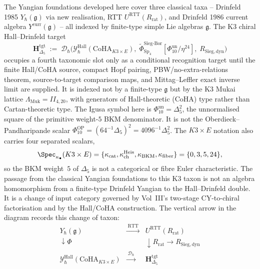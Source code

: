 \begin{remark}
\label{rem:yangfnd-1}
The Yangian foundations developed here cover three classical taxa --
Drinfeld 1985 $Y_\hbar(\mathfrak g)$ via new realisation, RTT
$U^{\mathrm{RTT}}(R_{\mathrm{rat}})$, and Drinfeld 1986 current algebra
$Y^{\mathrm{curr}}(\mathfrak g)$ -- all indexed by finite-type simple
Lie algebras $\mathfrak g$. The K3 chiral Hall--Drinfeld target
\[
\mathbf H_{\Delta_5}^{\mathrm{tgt}} \;:=\; \mathcal D_\hbar\!\bigl(\mathcal Y^{\mathrm{Hall}}_\hbar(\mathrm{CoHA}_{K3\times E}),\;
\widetilde\Phi^{\mathrm{Sieg\text{-}Bor}}_{\mathrm{Sp}_4}[\Phi_{10}^{\mathrm{un}}/\eta^{24}],\;
R_{\mathrm{Sieg,dyn}}\bigr)
\]
occupies a fourth taxonomic slot only as a conditional recognition
target until the finite Hall/CoHA source, compact Hopf pairing,
PBW/no-extra-relations theorem, source-to-target comparison maps, and
Mittag--Leffler exact inverse limit are supplied. It is indexed not by
a finite-type $\mathfrak g$ but by the K3 Mukai lattice
$\Lambda_{\mathrm{Muk}} = II_{4,20}$, with generators of
Hall-theoretic (CoHA) type rather than Cartan-theoretic type. The
Igusa symbol here is
$\Phi_{10}^{\mathrm{un}}=\Delta_5^2$, the unnormalised square of the
primitive weight-$5$ BKM denominator. It is not the
Oberdieck--Pandharipande scalar
$\Phi_{10}^{\mathrm{OP}}=(64^{-1}\Delta_5)^2
=4096^{-1}\Delta_5^2$. The
$K3\times E$ notation also carries four separated scalars,
\[
\Spec_{\kappa_\bullet}(K3\times E)
=\{\kappa_{\mathrm{cat}},\kappa_{\mathrm{ch}}^{\mathrm{Heis}},
\kappa_{\mathrm{BKM}},\kappa_{\mathrm{fiber}}\}
=\{0,3,5,24\},
\]
so the BKM weight~$5$ of $\Delta_5$ is not a categorical or fibre
Euler characteristic.
The passage from the classical Yangian foundations to this K3 taxon
is not an algebra homomorphism from a finite-type Drinfeld Yangian to
the Hall--Drinfeld double. It is a change of input category governed
by Vol~III's two-stage CY-to-chiral factorisation and by the
Hall/CoHA construction. The vertical arrow in the diagram records this
change of taxon:
\[
\begin{array}{ccc}
Y_\hbar(\mathfrak g) & \xrightarrow{\;\mathrm{RTT}\;} & U^{\mathrm{RTT}}(R_{\mathrm{rat}}) \\
\downarrow{\scriptstyle\Phi} & & \downarrow{\scriptstyle R_{\mathrm{rat}}\to R_{\mathrm{Sieg,dyn}}} \\
\mathcal Y^{\mathrm{Hall}}_\hbar(\mathrm{CoHA}_{K3\times E}) & \xrightarrow{\;\mathcal D_\hbar\;} & \mathbf H_{\Delta_5}^{\mathrm{tgt}}
\end{array}
\]
\end{remark}
